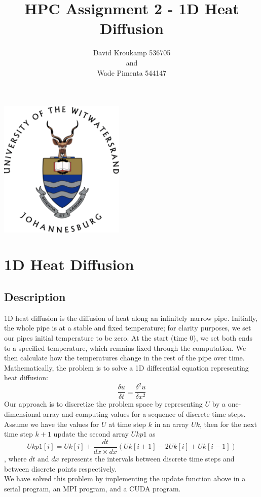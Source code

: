\documentclass{article}
\author{David Kroukamp 536705\\and\\Wade Pimenta 544147}
\title{HPC Assignment 2 - 1D Heat Diffusion}
\begin{document}
\null  %
\nointerlineskip  %
\vfill
\let\snewpage \newpage
\let\newpage \relax
\begin{center}
	\includegraphics[width=6cm]{logo.png}
\end{center}

\maketitle
\let \newpage \snewpage
\vfill 
\break %

\newpage
\tableofcontents
\newpage

\section{1D Heat Diffusion}
\subsection{Description}
1D heat diffusion is the diffusion of heat along an infinitely narrow pipe. Initially, the whole pipe is at a stable and fixed temperature; for clarity purposes, we set our pipes initial temperature to be zero. At the start (time 0), we set both ends to a specified temperature, which remains fixed through the computation. We then calculate how the temperatures change in the rest of the pipe over time. Mathematically, the problem is to solve a 1D differential equation representing heat diffusion:
$$\frac{\delta u}{\delta t} = \frac{\delta^{2}u}{\delta x^{2}}$$
Our approach is to discretize the problem space by representing $U$ by a one-dimensional array and computing values for a sequence of discrete time steps. Assume we have the values for $U$ at time step $k$ in an array $Uk$, then for the next time step $k + 1$ update the second array $Ukp1$ as
$$Ukp1[i] = Uk[i] + \frac{dt}{dx \times dx}(Uk[i+1] - 2Uk[i] + Uk[i-1])$$,
where $dt$ and $dx$ represents the intervals between discrete time steps and between discrete points respectively.\\
We have solved this problem by implementing the update function above in a serial program, an MPI program, and a CUDA program.
\end{document}
